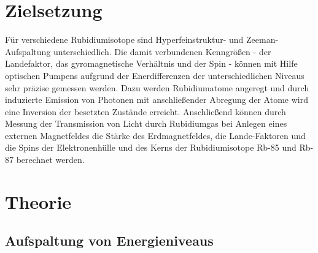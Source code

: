 \section{Zielsetzung}

Für verschiedene Rubidiumisotope sind Hyperfeinstruktur- und Zeeman-Aufspaltung unterschiedlich.
Die damit verbundenen Kenngrößen - der Landefaktor, das gyromagnetische Verhältnis und der Spin
- können mit Hilfe optischen Pumpens aufgrund der Enerdifferenzen der unterschiedlichen Niveaus
sehr präzise gemessen werden. Dazu werden Rubidiumatome angeregt und durch induzierte Emission
von Photonen mit anschließender Abregung der Atome wird eine Inversion der besetzten Zustände
erreicht. Anschließend können durch Messung der Transmission von Licht durch Rubidiumgas bei
Anlegen eines externen Magnetfeldes die Stärke des Erdmagnetfeldes, die Lande-Faktoren und die
Spins der Elektronenhülle und des Kerns der Rubidiumisotope Rb-85 und Rb-87 berechnet werden.

\section{Theorie}

\subsection{Aufspaltung von Energieniveaus}

